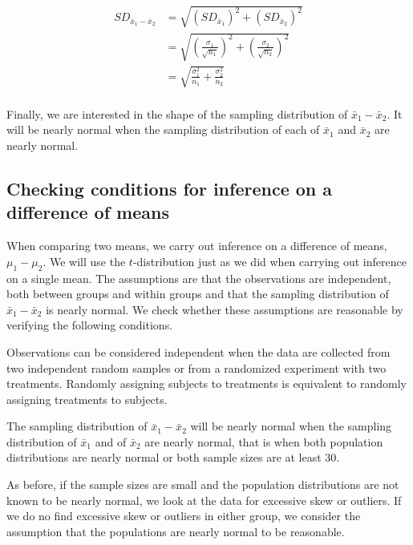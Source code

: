 \begin{align*}
SD_{\bar{x}_{1} - \bar{x}_{2}}
    &= \sqrt{\left(SD_{\bar{x}_{1}}\right)^2 +\left(SD_{\bar{x}_{2}}\right)^2 } \\
    &= \sqrt{\left(\frac{\sigma_{1}}{\sqrt{n_1}}\right)^2 + \left(\frac{\sigma_{2}}{\sqrt{n_2}}\right)^2 } \\
	&= \sqrt{\frac{\sigma_{1}^2}{n_{1}} + \frac{\sigma_{2}^2}{n_{2}}} \\
\end{align*}

Finally, we are interested in the shape of the sampling distribution of  $\bar{x}_1-\bar{x}_2$.  It will be nearly normal when the sampling distribution of each of $\bar{x}_1$ and $\bar{x}_2$ are nearly normal.

\subsection{Checking conditions for inference on a difference of means}
When comparing two means, we carry out inference on a difference of means, $\mu_1-\mu_2$.  We will use the $t$-distribution just as we did when carrying out inference on a single mean.  The assumptions are that the observations are independent, both between groups and within groups and that the sampling distribution of $\bar{x}_1-\bar{x}_2$ is nearly normal.  We check whether these assumptions are reasonable by verifying the following conditions.
\begin{description}
\setlength{\itemsep}{0mm}
\item[Independent.] Observations can be considered independent when the data are collected from two independent random samples or from a randomized experiment with two treatments.  Randomly assigning subjects to treatments is equivalent to randomly assigning treatments to subjects.  
\item[Nearly normal sampling distribution.] The sampling distribution of $\bar{x}_1-\bar{x}_2$ will be nearly normal when the sampling distribution of $\bar{x}_1$ and of $\bar{x}_2$ are nearly normal, that is when both population distributions are nearly normal or both sample sizes are at least 30.  
\end{description}

As before, if the sample sizes are small and the population distributions are not known to be nearly normal, we look at the data for excessive skew or outliers.  If we do no find excessive skew or outliers in either group, we consider the assumption that the populations are nearly normal to be reasonable.


